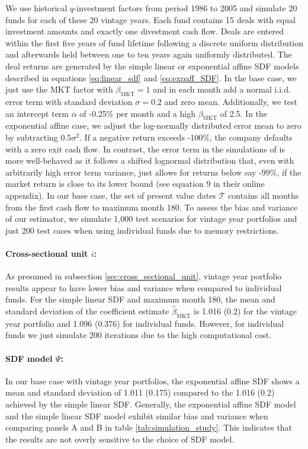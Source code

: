 \documentclass[12pt]{article}
\begin{document}
We use historical $q$-investment factors from period 1986 to 2005 and simulate 20 funds for each of these 20 vintage years.
Each fund contains 15 deals with equal investment amounts and exactly one divestment cash flow.
Deals are entered within the first five years of fund lifetime following a discrete uniform distribution and afterwards held between one to ten years again uniformly distributed.
The deal returns are generated by the simple linear or exponential affine SDF models described in equations \ref{eq:linear_sdf} and \ref{eq:expaff_SDF}.
In the base case, we just use the MKT factor with $\beta_{\mathrm{MKT}}=1$ and in each month add a normal i.i.d. error term with standard deviation $\sigma=0.2$ and zero mean.
Additionally, we test an intercept term $\alpha$ of -0.25\% per month and a high $\beta_{\mathrm{MKT}}$ of 2.5.
In the exponential affine case, we adjust the log-normally distributed error mean to zero by subtracting $0.5 \sigma^2$.
If a negative return exceeds -100\%, the company defaults with a zero exit cash flow.
In contrast, the error term in the simulations of \cite{DLP12} is more well-behaved as it follows a shifted lognormal distribution that, even with arbitrarily high error term variance, just allows for returns below say -99\%, if the market return is close to its lower bound (see equation 9 in their online appendix).
In our base case, the set of present value dates $\mathcal{T}$ contains all months from the first cash flow to maximum month 180.
To assess the bias and variance of our estimator, we simulate 1,000 test scenarios for vintage year portfolios and just 200 test cases when using individual funds due to memory restrictions. 


\paragraph{Cross-sectional unit $i$:}
As presumed in subsection \ref{sec:cross_sectional_unit}, vintage year portfolio results appear to have lower bias and variance when compared to individual funds.
For the simple linear SDF and maximum month 180, the mean and standard deviation of the coefficient estimate $\hat{\beta}_{\mathrm{MKT}}$ is 1.016 (0.2) for the vintage year portfolio and 1.096 (0.376) for individual funds. However, for individual funds we just simulate 200 iterations due to the high computational cost.

\paragraph{SDF model $\Psi$:}
In our base case with vintage year portfolios, the exponential affine SDF shows a mean and standard deviation of 1.011 (0.175) compared to the 1.016 (0.2) achieved by the simple linear SDF.
Generally, the exponential affine SDF model and the simple linear SDF model exhibit similar bias and variance when comparing panels A and B in table \ref{tab:simulation_study}.
This indicates that the results are not overly sensitive to the choice of SDF model.
\end{document}
